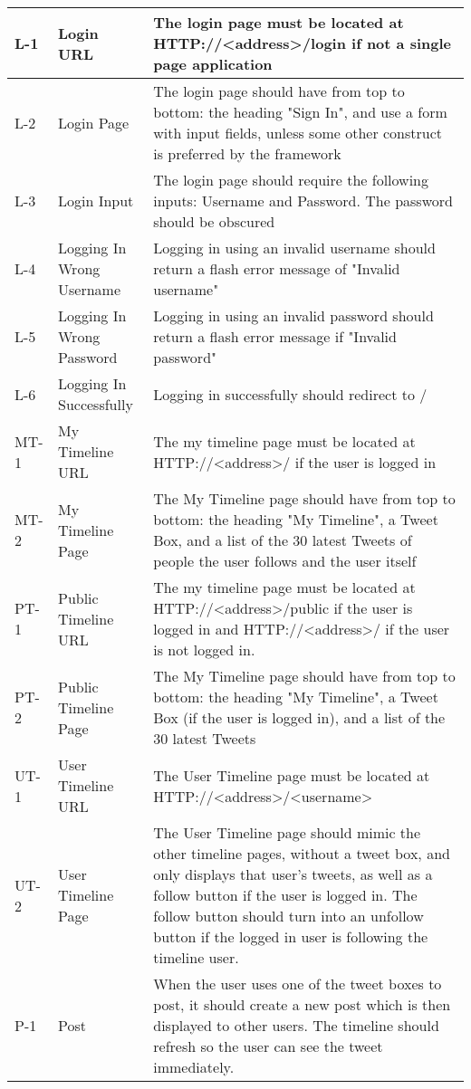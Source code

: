 \documentclass[main.tex]{subfiles}
\begin{document}
\begin{table*}[h]
\begin{tabular}{|m{1cm}|m{3cm}|m{12cm}|}
        \hline
        L-1 & Login URL & The login page must be located at HTTP://<address>/login if not a single page application \\
        \hline
        L-2 & Login Page & The login page should have from top to bottom: the heading "Sign In", and use a form with input fields, unless some other construct is preferred by the framework \\
        \hline
        L-3 & Login Input & The login page should require the following inputs: Username and Password. The password should be obscured \\
        \hline
        L-4 & Logging In Wrong Username & Logging in using an invalid username should return a flash error message of "Invalid username" \\
        \hline
        L-5 & Logging In Wrong Password & Logging in using an invalid password should return a flash error message if "Invalid password" \\
        \hline
        L-6 & Logging In Successfully & Logging in successfully should redirect to / \\
        \hline


        \hline
        MT-1 & My Timeline URL & The my timeline page must be located at HTTP://<address>/ if the user is logged in\\
        \hline
        MT-2 & My Timeline Page & The My Timeline page should have from top to bottom: the heading "My Timeline", a Tweet Box, and a list of the 30 latest Tweets of people the user follows and the user itself \\
        \hline


        \hline
        PT-1& Public Timeline URL& The my timeline page must be located at HTTP://<address>/public if the user is logged in and HTTP://<address>/ if the user is not logged in.\\
        \hline
        PT-2& Public Timeline Page& The My Timeline page should have from top to bottom: the heading "My Timeline", a Tweet Box (if the user is logged in), and a list of the 30 latest Tweets\\
        \hline
        UT-1& User Timeline URL& The User Timeline page must be located at HTTP://<address>/<username> \\
        \hline
        UT-2& User Timeline Page& The User Timeline page should mimic the other timeline pages, without a tweet box, and only displays that user's tweets, as well as a follow button if the user is logged in. The follow button should turn into an unfollow button if the logged in user is following the timeline user.\\
        \hline
        P-1& Post& When the user uses one of the tweet boxes to post, it should create a new post which is then displayed to other users. The timeline should refresh so the user can see the tweet immediately.\\
        \hline


\end{tabular}
\end{table*}
\end{document}

